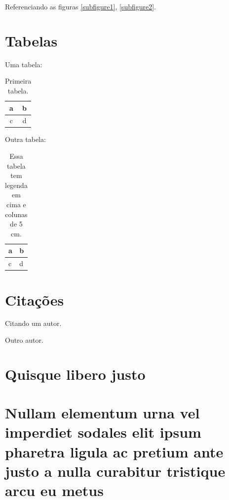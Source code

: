 \documentclass{abntex2}
\begin{document}
Referenciando as figuras \ref{subfigure1}, \ref{subfigure2}.

\chapter{Tabelas}
Uma tabela:
\begin{table}[h]
	\centering
	\begin{tabular}{|c|c|}
		\hline
		a & b \\
		\hline
		c & d \\
		\hline
	\end{tabular}
	\caption{Primeira tabela.}
\end{table}

Outra tabela:
\begin{table}[h]
	\centering
	\caption{Essa tabela tem legenda em cima e colunas de 5 cm.}
	\begin{tabular}{|p{5cm}|p{5cm}|}
		\hline
		a & b \\
		\hline
		c & d \\
		\hline
	\end{tabular}
\end{table}

\chapter{Citações}

Citando um autor\cite{calculo}.

Outro autor\cite{kelp}.

\begin{apendicesenv}

\partapendices

\chapter{Quisque libero justo}

\lipsum[50]

\chapter{Nullam elementum urna vel imperdiet sodales elit ipsum pharetra ligula
ac pretium ante justo a nulla curabitur tristique arcu eu metus}
\lipsum[55-57]

\end{apendicesenv}
\end{document}

